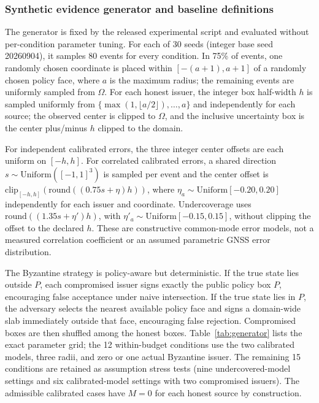 \subsubsection{Synthetic evidence generator and baseline definitions}
The generator is fixed by the released experimental script and evaluated without per-condition parameter tuning. For each of 30 seeds (integer base seed 20260904), it samples 80 events for every condition. In 75\% of events, one randomly chosen coordinate is placed within $[-(a+1),a+1]$ of a randomly chosen policy face, where $a$ is the maximum radius; the remaining events are uniformly sampled from $\Omega$. For each honest issuer, the integer box half-width $h$ is sampled uniformly from $\{\max(1,\lfloor a/2\rfloor),\ldots,a\}$ and independently for each source; the observed center is clipped to $\Omega$, and the inclusive uncertainty box is the center plus/minus $h$ clipped to the domain.

For independent calibrated errors, the three integer center offsets are each uniform on $[-h,h]$. For correlated calibrated errors, a shared direction $s\sim\mathrm{Uniform}([-1,1]^3)$ is sampled per event and the center offset is $\mathrm{clip}_{[-h,h]}(\mathrm{round}((0.75s+\eta)h))$, where $\eta_a\sim\mathrm{Uniform}[-0.20,0.20]$ independently for each issuer and coordinate. Undercoverage uses $\mathrm{round}((1.35s+\eta')h)$, with $\eta'_a\sim\mathrm{Uniform}[-0.15,0.15]$, without clipping the offset to the declared $h$. These are constructive common-mode error models, not a measured correlation coefficient or an assumed parametric GNSS error distribution.

The Byzantine strategy is policy-aware but deterministic. If the true state lies outside $P$, each compromised issuer signs exactly the public policy box $P$, encouraging false acceptance under naive intersection. If the true state lies in $P$, the adversary selects the nearest available policy face and signs a domain-wide slab immediately outside that face, encouraging false rejection. Compromised boxes are then shuffled among the honest boxes. Table~\ref{tab:generator} lists the exact parameter grid; the 12 within-budget conditions use the two calibrated models, three radii, and zero or one actual Byzantine issuer. The remaining 15 conditions are retained as assumption stress tests (nine undercovered-model settings and six calibrated-model settings with two compromised issuers). The admissible calibrated cases have $M=0$ for each honest source by construction.

